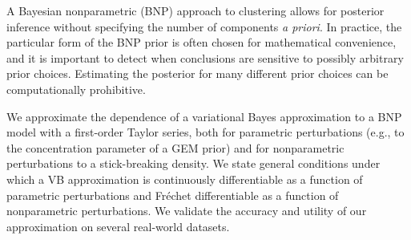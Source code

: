 A Bayesian nonparametric (BNP) approach to clustering allows for posterior
inference without specifying the number of components {\em a priori}.  In practice,
the particular form of the BNP prior is often chosen for mathematical
convenience, and it is important to detect when conclusions are sensitive to
possibly arbitrary prior choices.  Estimating the posterior for many
different prior choices can be computationally prohibitive.

We approximate the dependence of a variational Bayes approximation to a BNP
model with a first-order Taylor series, both for parametric perturbations (e.g.,
to the concentration parameter of a GEM prior) and for nonparametric
perturbations to a stick-breaking density. We state general conditions under
which a VB approximation is continuously differentiable as a function of
parametric perturbations and Fr{\'e}chet differentiable as a function of
nonparametric perturbations.  We validate the accuracy and utility of our
approximation on several real-world datasets.
